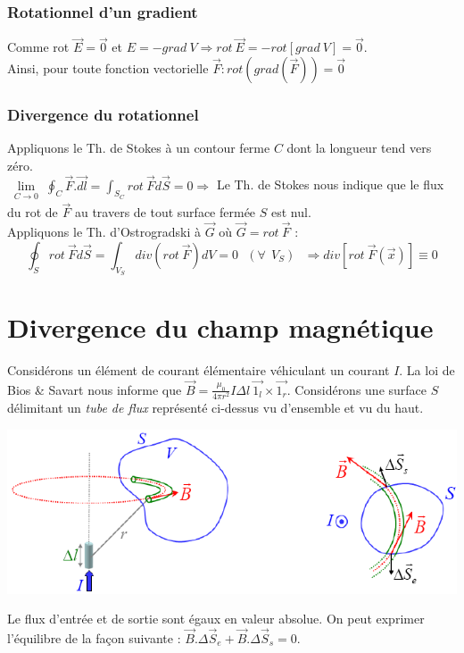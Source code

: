 \documentclass	[11pt, a4paper, openany]{book}
\begin{document}
\subsubsection{Rotationnel d'un gradient}
Comme rot $\vec{E} = \vec{0}$ et $E = - grad\ V \Rightarrow rot\ \vec{E} = -rot[grad\ V] = \vec{0}$.\\
Ainsi, pour toute fonction vectorielle $\vec{F} : rot(grad(\vec{F})) = \vec{0}$

\subsubsection{Divergence du rotationnel}
Appliquons le Th. de Stokes à un contour ferme $C$ dont la longueur tend vers zéro.\\
$\lim\limits_{\substack{C \to 0}} \oint_C \vec{F}.\vec{dl} = \int_{S_C} rot\ \vec{F} d\vec{S} = 0 \Rightarrow$ Le Th. de Stokes nous indique que le flux du rot de $\vec{F}$ au travers de tout surface fermée $S$ est nul.\\
Appliquons le Th. d'Ostrogradski à $\vec{G}$ où $\vec{G} = rot\ \vec{F}$ :
\begin{equation}
	\oint_S rot\ \vec{F}d\vec{S} = \int_{V_S} div(rot\ \vec{F})dV = 0\ \ \ (\forall\ \ V_S)\ \ \ \Rightarrow div[rot\ \vec{F}(\vec{x})] \equiv 0
\end{equation}


\section{Divergence du champ magnétique}
Considérons un élément de courant élémentaire véhiculant un courant $I$. La loi de Bios \& Savart nous informe que $\vec{B} = \frac{\mu_0}{4\pi r^2}I\Delta l\ \vec{1_l} \times \vec{1_r}$. Considérons une surface $S$ délimitant un \textit{tube de flux} représenté ci-dessus vu d'ensemble et vu du  haut.
\begin{center}
	\includegraphics[scale=0.60]{magneto/image20.png}\\
\end{center}
Le flux d'entrée et de sortie sont égaux en valeur absolue. On peut exprimer l'équilibre de la façon suivante : $\vec{B}.\Delta\vec{S}_e + \vec{B}.\Delta\vec{S}_s = 0$.\\
\end{document}
